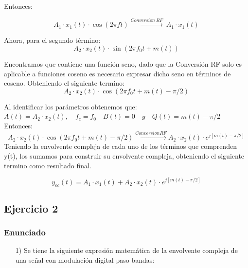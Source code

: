 \begin{enumerate}
Entonces:

\begin{equation} \label{capdos_diecinueve}
 A_{1}\cdot x_{1}(t)\cdot \cos (2\pi ft)  \overset{Conversion \ RF}{\rightarrow} \ 
 A_{1}\cdot x_{1}(t)
\end{equation}

Ahora, para el segundo término: 
\begin{equation} \label{capdos_veinte}
A_{2}\cdot x_{2}(t)\cdot \sin (2\pi f_{0}t+ m(t))
\end{equation}

Encontramos que contiene una función seno, dado que la Conversión RF solo es aplicable a funciones coseno es necesario expresar dicho seno en términos de coseno. Obteniendo el siguiente termino:
\begin{equation} \label{capdos_veintiuno}
A_{2}\cdot x_{2}(t)\cdot \cos (2\pi f_{0}t + m(t)-\pi/2)
\end{equation}

Al identificar los parámetros obtenemos que: \\$A(t) = A_{2} \cdot x_{2}(t),\hspace{1em} f_{c}=f_{0} \hspace{1em} B(t)=0 \hspace{1em} y\hspace{1em} Q(t)=m(t)-\pi/2$\\

Entonces:
\begin{equation} \label{capdos_veintidos}
 A_{2}\cdot x_{2}(t)\cdot \cos (2\pi f_{0}t + m(t) -\pi/2)  \overset{Conversion RF}{\rightarrow} A_{2}\cdot x_{2}(t)\cdot e^{j[ m(t)-\pi/2]}
\end{equation}
Teniendo la envolvente compleja de cada uno de los términos que comprenden y(t), los sumamos para construir su envolvente compleja, obteniendo el siguiente termino como resultado final.

\begin{equation} \label{capdos_veintitres}
 y_{ec}(t)=A_{1}\cdot x_{1}(t) + A_{2}\cdot x_{2}(t)\cdot e^{j[m(t)-\pi/2]}
\end{equation}

\end{enumerate}
\subsection{Ejercicio 2}
\subsubsection{Enunciado}
\begin{itemize}
 \item[1)] Se tiene la siguiente expresión matemática de la envolvente compleja de una señal con modulación digital paso bandas:
 \end{itemize}
 

